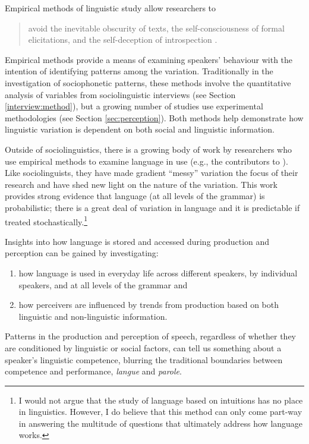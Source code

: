 Empirical methods of linguistic study allow researchers to

\begin{quote}
avoid the inevitable obscurity of texts, the self-con\-scious\-ness of formal elicitations, and the self-deception of introspection \cite[xix]{labov1972sociolingpatterns}.
\end{quote}

\noindent Empirical methods provide a means of examining speakers' behaviour with the intention of identifying patterns among the variation.  Traditionally in the investigation of sociophonetic patterns, these methods involve the quantitative analysis of variables from sociolinguistic interviews (see Section \ref{interview:method}), but a growing number of studies use experimental methodologies (see Section \ref{sec:perception}).  Both methods help demonstrate how linguistic variation is dependent on both social and linguistic information.


Outside of sociolinguistics, there is a growing body of work by researchers who use empirical methods to examine  language in use (e.g., the contributors to ). Like sociolinguists, they have made gradient ``messy'' variation the focus of their research and have shed new light on the nature of the variation.  This work provides strong evidence that language (at all levels of the grammar) is probabilistic; there is a great deal of variation in language and it is predictable if treated stochastically.\footnote{I would not argue that the study of language based on intuitions has no place in linguistics.  However, I do believe that this method can only come part-way in answering the multitude of questions that ultimately address how language works.}

Insights into how language is stored and accessed during production and perception can be gained by investigating: \nocite{saussure1916}   

\begin{enumerate}
	\item how language is used in everyday life across different speakers, by individual speakers, and at all levels of the grammar and
	\item how perceivers are influenced by trends from production based on both linguistic and non-linguistic information.
\end{enumerate}

\noindent Patterns in the production and perception of speech, regardless of whether they are conditioned by linguistic or social factors, can tell us something about a speaker's linguistic competence, blurring the traditional boundaries between competence and performance, \textit{langue} and \textit{parole}.  



